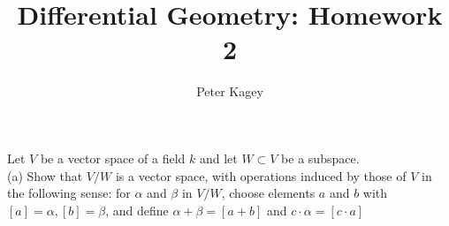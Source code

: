 \documentclass{article}
\newenvironment{problem}[2][Problem]{\begin{trivlist}
\item[\hskip \labelsep {\bfseries #1}\hskip \labelsep {\bfseries #2.}]}{\end{trivlist}}
\begin{document}
\title{Differential Geometry: Homework 2}
\author{Peter Kagey}

\maketitle

\begin{problem}{1}
  Let $V$ be a vector space of a field $k$ and let $W \subset V$ be a subspace. \\
  (a) Show that $V/W$ is a vector space, with operations induced by those of $V$ in
    the following sense: for $\alpha$ and $\beta$ in $V/W$,
    choose elements $a$ and $b$ with $[a] = \alpha, [b] = \beta$, and define
    $\alpha + \beta = [a + b]$ and $c \cdot \alpha = [c \cdot a]$
\end{problem}
\end{document}
